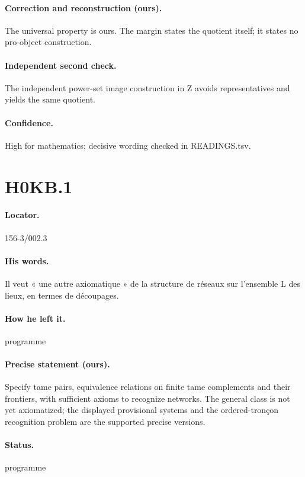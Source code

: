 \paragraph{Correction and reconstruction (ours).} The universal property is ours. The margin states the quotient itself; it states no pro-object construction.

\paragraph{Independent second check.} The independent power-set image construction in Z avoids representatives and yields the same quotient.

\paragraph{Confidence.} High for mathematics; decisive wording checked in READINGS.tsv.

\section*{H0KB.1}\label{statement:H0KB.1}
\paragraph{Locator.} 156-3/002.3

\paragraph{His words.} Il veut « une autre axiomatique » de la structure de réseaux sur l’ensemble L des lieux, en termes de découpages.

\paragraph{How he left it.} programme

\paragraph{Precise statement (ours).} Specify tame pairs, equivalence relations on finite tame complements and their frontiers, with sufficient axioms to recognize networks. The general class is not yet axiomatized; the displayed provisional systems and the ordered-tronçon recognition problem are the supported precise versions.

\paragraph{Status.} programme

